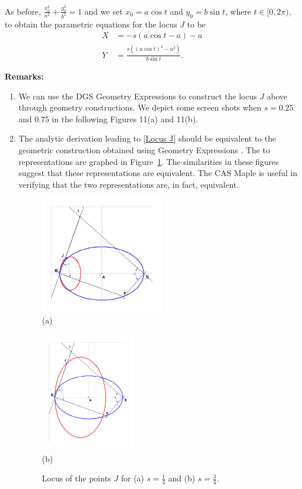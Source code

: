 \documentclass[12pt,a4paper]{article}%
\begin{document}
As before, $\frac{x_{0}^{2}}{a^{2}}+\frac{y_{0}^{2}}{b^{2}}=1$
and we set $x_{0}=a\cos t$ and $y_{0}=b\sin t$, where $t\in[0,2\pi)$,
to obtain the parametric equations for the locus $J$ to be
\begin{align}
X  & =-s( a\cos t-a) -a                                   \label{Locus J}\\
Y  & =\frac{s\left((a\cos t)^{2}-a^{2}\right)  }{b\sin t}.\nonumber
\end{align}

\textbf{Remarks: }
\begin{enumerate}
\item We can use the DGS Geometry Expressions \cite{GE} to construct
      the locus $J$ above through geometry constructions.
      We depict some screen shots when $s=0.25$ and $0.75$ in the
      following Figures 11(a) and 11(b).

\item
The analytic derivation leading to \ref{Locus J} should be equivalent to
the geometric construction obtained using Geometry Expressions \cite{GE}.
The to representations are graphed in Figure~\ref{fig11}. The similarities
in these figures suggest that these representations are equivalent.
The CAS Maple \cite{Maple} is useful in verifying that the two representations
are, in fact, equivalent.

\begin{figure}[htpb]
\begin{center}
\parbox[b]{2.2in}{\begin{center}
\includegraphics[natheight=3.845900in,natwidth=4.059700in,height=2.017in,width=2.1288in]{PJH75I1K.pdf}
 \\ (a)
\end{center}}
\qquad
\parbox[b]{2.2in}{\begin{center}
\includegraphics[natheight=4.921900in,natwidth=3.853000in,height=2.0738in,width=1.6276in]{PJH75I1L.pdf}
 \\ (b)
\end{center}}
\end{center}
\caption{Locus of the points $J$ for (a) $s=\frac{1}{4}$ and (b) $s=\frac{3}{4}$.}
\label{fig11}
\end{figure}


\end{enumerate}
\end{document}
